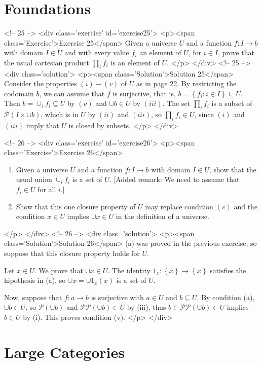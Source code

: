 \section{Foundations}

<!-- 25 -->
<div class='exercise' id='exercise25'>
<p><span class='Exercise'>Exercise 25</span>
Given a universe $U$ and a function $f:I\to b$ with domain $I\in U$ and with every value $f_i$ an element of $U$, for $i\in I$, prove that the usual cartesian product $\prod_i f_i$ is an element of $U$.
</p>
</div>
<!-- 25 -->
<div class='solution'>
<p><span class='Solution'>Solution 25</span>
Consider the properties $(i)-(v)$ of $U$ as in page 22. By restricting the codomain $b$, we can assume that $f$ is surjective, that is, $b=\left\{f_i:i\in I\right\}\subseteq U$. Then $b=\cup_i f_i\subseteq U$ by $(v)$ and $\cup b\in U$ by $(iii)$. The set $\prod_i f_i$ is a subset of $\mathscr{P}(I\times \cup b)$, which is in $U$ by $(ii)$ and $(iii)$, so $\prod_i f_i\in U$, since $(i)$ and $(iii)$ imply that $U$ is closed by subsets.
</p>
</div>

<!-- 26 -->
<div class='exercise' id='exercise26'>
<p><span class='Exercise'>Exercise 26</span>
\begin{enumerate}
\item[(a)] Given a universe $U$ and a function $f:I\to b$ with domain $I\in U$, show that the usual union $\cup_i f_i$ is a set of $U$. [Added remark: We need to assume that $f_i\in U$ for all $i$.]
\item[(b)] Show that this one closure property of $U$ may replace condition $(v)$ and the condition $x\in U$ implies $\cup x\in U$ in the definition of a universe.
\end{enumerate}
</p>
</div>
<!-- 26 -->
<div class='solution'>
<p><span class='Solution'>Solution 26</span>
(a) was proved in the previous exercise, so suppose that this closure property holds for $U$.

Let $x\in U$. We prove that $\cup x\in U$. The identity $1_x:\left\{x\right\}\to\left\{x\right\}$ satisfies the hipothesis in (a), so $\cup x=\cup 1_x(x)$ is a set of $U$.

Now, suppose that $f:a\to b$ is surjective with $a\in U$ and $b\subseteq U$. By condition (a), $\cup b\in U$, so $\mathscr{P}(\cup b)$ and $\mathscr{P}\mathscr{P}(\cup b)\in U$ by (iii), thus $b\in\mathscr{P}\mathscr{P}(\cup b)\in U$ implies $b\in U$ by (i). This proves condition (v).
</p>
</div>

\section{Large Categories}

